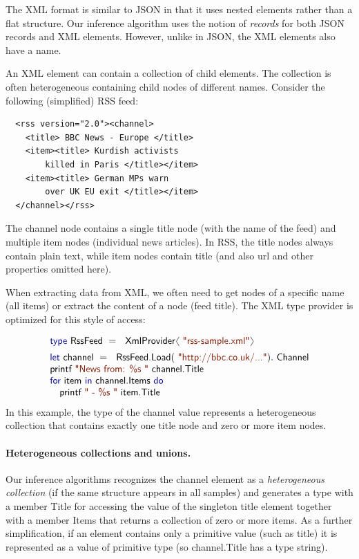 \documentclass[preprint]{sigplanconf}
\newcommand{\langl}{\begin{picture}(4.5,7)
\put(1.1,2.5){\rotatebox{60}{\line(1,0){5.5}}}
\put(1.1,2.5){\rotatebox{300}{\line(1,0){5.5}}}
\end{picture}}
\newcommand{\rangl}{\begin{picture}(4.5,7)
\put(.9,2.5){\rotatebox{120}{\line(1,0){5.5}}}
\put(.9,2.5){\rotatebox{240}{\line(1,0){5.5}}}
\end{picture}}
\newcommand{\kvd}[1]{\textnormal{\textcolor{kvdclr}{\sffamily #1}}}
\newcommand{\str}[1]{\textnormal{\textcolor{strclr}{\sffamily "#1"}}}
\newcommand{\ident}[1]{\textnormal{\sffamily #1}}
\begin{document}
The XML format is similar to JSON in that it uses nested elements rather than a flat 
structure. Our inference algorithm uses the notion of \emph{records} for both JSON records 
and XML elements. However, unlike in JSON, the XML elements also have a name. 

An XML element can contain a collection of child elements. The collection is often heterogeneous 
containing child nodes of different names. Consider the following (simplified) RSS feed:
%
{\small{
\begin{verbatim}
  <rss version="2.0"><channel>
    <title> BBC News - Europe </title>
    <item><title> Kurdish activists 
        killed in Paris </title></item>
    <item><title> German MPs warn 
        over UK EU exit </title></item>
  </channel></rss>
\end{verbatim}
}}
%
\noindent
The \ident{channel} node contains a single \ident{title} node (with the name of the feed) and multiple 
\ident{item} nodes (individual news articles). In RSS, the \ident{title} nodes always contain plain text,
while \ident{item} nodes contain \ident{title} (and also \ident{url} and other properties omitted here).

When extracting data from XML, we often need to get nodes of a specific name (all
items) or extract the content of a node (feed title). The XML type provider is optimized for 
this style of access:

\noindent
\begin{equation*}
\begin{array}{l}
 \kvd{type}~\ident{RssFeed}~=~\ident{XmlProvider}\langl\str{rss-sample.xml}\rangl\hspace{1em} \\[0.5em]
 \kvd{let}~\ident{channel}~=~\ident{RssFeed.Load}(\str{http://bbc.co.uk/...}).\ident{Channel}\\
 \ident{printf}~\str{News from: \%s }~\ident{channel.Title}\\
 \kvd{for}~\ident{item}~\kvd{in}~\ident{channel.Items}~\kvd{do}\\
 \quad\ident{printf}~\str{ - \%s }~\ident{item.Title}\\
\end{array}
\end{equation*}
%
In this example, the type of the \ident{channel} value represents a heterogeneous collection
that contains exactly one \ident{title} node and zero or more \ident{item} nodes.

\paragraph{Heterogeneous collections and unions.}
Our inference algorithms recognizes the \ident{channel} element as a \emph{heterogeneous collection} (if the same structure 
appears in all samples) and generates a type with a member \ident{Title} for accessing the value 
of the singleton \ident{title} element together with a member \ident{Items} that returns a 
collection of zero or more items. As a further simplification, if an element contains only a 
primitive value (such as \ident{title}) it is represented as a value of primitive type (so 
\ident{channel.Title} has a type \ident{string}).
\end{document}

